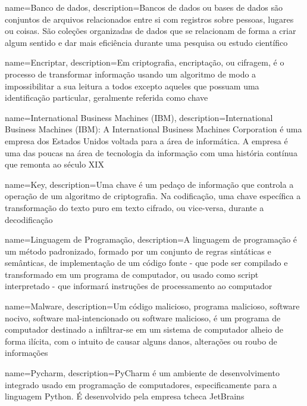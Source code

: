 \makeglossaries
{
	name={Banco de dados},
	description={Bancos de dados ou bases de dados são conjuntos de arquivos relacionados entre si com registros sobre pessoas, lugares ou coisas. São coleções organizadas de dados que se relacionam de forma a criar algum sentido e dar mais eficiência durante uma pesquisa ou estudo científico}
}

{
	name={Encriptar},
	description={Em criptografia, encriptação, ou cifragem, é o processo de transformar informação usando um algoritmo de modo a impossibilitar a sua leitura a todos excepto aqueles que possuam uma identificação particular, geralmente referida como chave}
}

{
	name={International Business Machines (IBM)},
	description={International Business Machines (IBM): A International Business Machines Corporation é uma empresa dos Estados Unidos voltada para a área de informática. A empresa é uma das poucas na área de tecnologia da informação com uma história
			contínua que remonta ao século XIX}
}

{
	name={Key},
	description={Uma chave é um pedaço de informação que controla a operação de um algoritmo de criptografia. Na codificação, uma chave específica a transformação do texto puro em texto cifrado, ou vice-versa, durante a decodificação}
}

{
	name={Linguagem de Programação},
	description={A linguagem de programação é um método padronizado, formado por um conjunto de regras sintáticas e semânticas, de implementação de um código fonte - que pode ser compilado e transformado em um programa de computador, ou usado como script interpretado - que informará instruções de processamento ao computador}
}

{
	name={Malware},
	description={Um código malicioso, programa malicioso, software nocivo, software mal-intencionado ou software malicioso, é um programa de computador destinado a infiltrar-se em um sistema de computador alheio de forma ilícita, com o intuito de causar alguns danos, alterações ou roubo de informações}
}

{
	name={Pycharm},
	description={PyCharm é um ambiente de desenvolvimento integrado usado em programação de computadores, especificamente para a linguagem Python. É desenvolvido pela empresa tcheca JetBrains}
}

